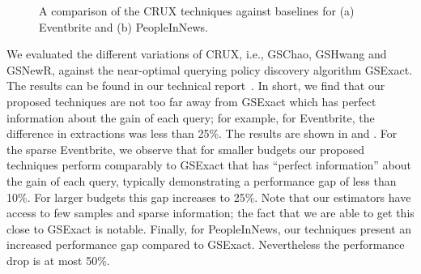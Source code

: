 \begin{figure}
\begin{center}
\end{center}
\vspace{-15pt}
\caption{A comparison of the CRUX techniques against baselines for (a) Eventbrite and (b) PeopleInNews.}
\label{fig:resultsextr1}
\vspace{-5pt}
\end{figure}

We evaluated the different variations of CRUX, i.e., GSChao, GSHwang and GSNewR, 
against the near-optimal querying policy discovery algorithm GSExact. 
\ifpaper
The results can be found in our technical report~\cite{cruxsup}. In short, we
find that our proposed techniques are not too far away from 
GSExact which has perfect information about the gain of each query;
for example, for Eventbrite, the difference in extractions was less than 25\%.
\fi
\iftr
The results are shown in  and . For the sparse Eventbrite, we observe that for smaller budgets our proposed techniques perform comparably to GSExact that has ``perfect information'' about the gain of each query, typically demonstrating a performance gap of less than 10\%. For larger budgets this gap increases to 25\%. Note that our estimators have access to few samples and sparse information; the fact that we are able to get this close to GSExact is notable. Finally, for PeopleInNews, our techniques present an increased performance gap compared to GSExact. Nevertheless the performance drop is at most 50\%.

